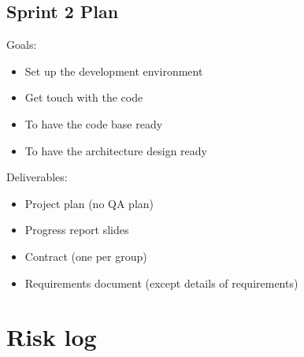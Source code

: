 \subsection{Sprint 2 Plan}

Goals:
\begin{itemize}
\item Set up the development environment
\item Get touch with the code 
\item To have the code base ready 
\item To have the architecture design ready
\end{itemize}

\noindent Deliverables:
\begin{itemize}
\item Project plan (no QA plan)
\item Progress report slides
\item Contract (one per group)
\item Requirements document (except details of requirements)
\end{itemize}

\section{Risk log}

\begin{table}[H]
\center
{}
\caption{A risk log (Probability: 1=lowest, 3=highest, Severity: 1= lowest, 
3=highest)}
\label{table:Risklog}
\end{table}

